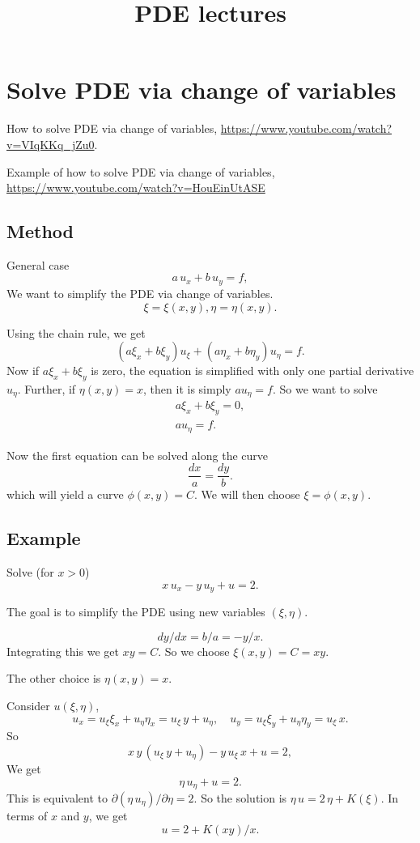 \documentclass{article}
\begin{document}
\title{PDE lectures}
\author{ \vspace{-10ex} }
\date{ \vspace{-10ex} }
\maketitle

\tableofcontents

\section{Solve PDE via change of variables}

How to solve PDE via change of variables, \url{https://www.youtube.com/watch?v=VIqKKq_jZu0}.

Example of how to solve PDE via change of variables, \url{https://www.youtube.com/watch?v=HouEinUtASE}

\subsection{Method}

General case
$$
a \, u_x + b \, u_y = f,
$$
We want to simplify the PDE via change of variables.
$$
\xi = \xi(x, y), \eta = \eta(x, y).
$$

Using the chain rule, we get
$$
(a \xi_x + b \xi_y) u_\xi + (a \eta_x + b \eta_y) u_\eta = f.
$$
Now if $a \xi_x + b \xi_y$ is zero,
the equation is simplified with only one partial derivative $u_\eta$.
Further, if $\eta(x, y) = x$, then it is simply $a u_\eta = f$.
So we want to solve
$$
\begin{aligned}
a \xi_x + b \xi_y = 0, \\
a u_\eta = f.
\end{aligned}
$$

Now the first equation can be solved along the curve
$$
\frac{ dx } { a } = \frac { dy } { b }.
$$
which will yield a curve $\phi(x, y) = C$.
%
We will then choose $\xi = \phi(x, y)$.


\subsection{Example}

Solve (for $x > 0$)
$$
x \, u_x - y \, u_y + u  = 2.
$$

The goal is to simplify the PDE using new variables $(\xi, \eta)$.

$$
dy/dx = b/a = - y/x.
$$
Integrating this we get $xy = C$.
So we choose $\xi(x, y) = C = xy$.

The other choice is $\eta(x, y) = x$.

Consider $u(\xi, \eta)$,
$$
u_x = u_\xi \xi_x + u_\eta \eta_x = u_\xi \, y + u_\eta,
\quad
u_y = u_\xi \xi_y + u_\eta \eta_y = u_\xi \, x.
$$
So
$$
x \, y \, (u_\xi \, y + u_\eta)
- y \, u_\xi \, x + u = 2,
$$
We get
$$
\eta \, u_\eta + u = 2.
$$
This is equivalent to $\partial ( \eta \, u_\eta ) /\partial \eta = 2$.
So the solution is
$\eta \, u = 2 \, \eta + K(\xi)$.
In terms of $x$ and $y$, we get
$$
u = 2 + K(xy)/x.
$$
\end{document}
